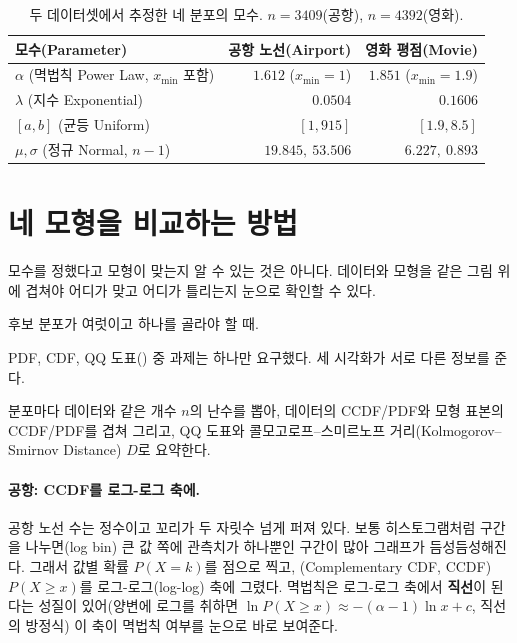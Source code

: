 \begin{table}[H]
\centering
\begin{tabular}{lrr}
\toprule
모수(Parameter) & 공항 노선(Airport) & 영화 평점(Movie) \\
\midrule
$\alpha$ (멱법칙 Power Law, $x_{\min}$ 포함) & $1.612$ ($x_{\min}=1$) & $1.851$ ($x_{\min}=1.9$) \\
\midrule
$\lambda$ (지수 Exponential)      & $0.0504$               & $0.1606$ \\
\midrule
$[a, b]$ (균등 Uniform)           & $[1, 915]$             & $[1.9, 8.5]$ \\
\midrule
$\mu, \sigma$ (정규 Normal, $n{-}1$) & $19.845,\ 53.506$   & $6.227,\ 0.893$ \\
\bottomrule
\end{tabular}
\caption{두 데이터셋에서 추정한 네 분포의 모수. $n = 3409$(공항), $n = 4392$(영화).}
\label{tab:hw2-params}
\end{table}

\section{네 모형을 비교하는 방법}
\label{sec:hw2-compare-how}

\begin{inbrief}
  \item[Why] 모수를 정했다고 모형이 맞는지 알 수 있는 것은 아니다. 데이터와 모형을
    같은 그림 위에 겹쳐야 어디가 맞고 어디가 틀리는지 눈으로 확인할 수 있다.
  \item[When] 후보 분포가 여럿이고 하나를 골라야 할 때.
  \item[Where] PDF, CDF, QQ 도표() 중 과제는 하나만 요구했다. 세
    시각화가 서로 다른 정보를 준다.
  \item[How] 분포마다 데이터와 같은 개수 $n$의 난수를 뽑아, 데이터의 CCDF/PDF와
    모형 표본의 CCDF/PDF를 겹쳐 그리고, QQ 도표와 콜모고로프--스미르노프
    거리(Kolmogorov--Smirnov Distance) $D$로 요약한다.
\end{inbrief}

\paragraph{공항: CCDF를 로그-로그 축에.}
공항 노선 수는 정수이고 꼬리가 두 자릿수 넘게 퍼져 있다. 보통 히스토그램처럼 구간을
나누면(log bin) 큰 값 쪽에 관측치가 하나뿐인 구간이 많아 그래프가 듬성듬성해진다.
그래서 값별 확률 $P(X=k)$를 점으로 찍고, (Complementary CDF,
CCDF) $P(X \geq x)$를 로그-로그(log-log) 축에 그렸다. 멱법칙은 로그-로그 축에서
\textbf{직선}이 된다는 성질이 있어(양변에 로그를 취하면 $\ln P(X\geq x) \approx
-(\alpha-1)\ln x + c$, 직선의 방정식) 이 축이 멱법칙 여부를 눈으로 바로 보여준다.

